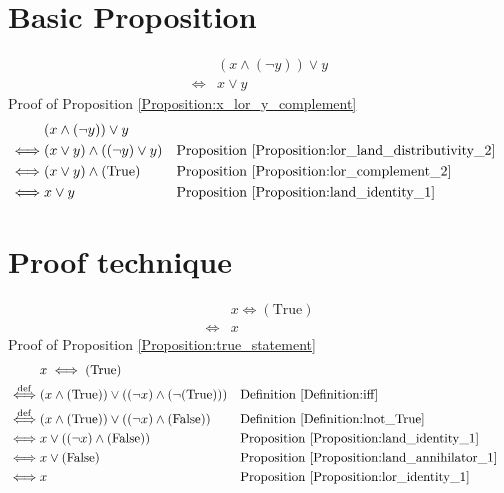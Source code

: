 \section{Basic Proposition}
\begin{prop}
\label{Proposition:x_lor_y_complement}
\begin{align*}
& (x \land (\lnot y)) \lor y \\
\iff & x \lor y
\end{align*}
Proof of Proposition \ref{Proposition:x_lor_y_complement}
\begin{align*}
& (x \land (\lnot y)) \lor y \\
\iff & (x \lor y) \land ((\lnot y) \lor y)
&& \text{Proposition \ref{Proposition:lor_land_distributivity_2}} \\
\iff & (x \lor y) \land (\text{True})
&& \text{Proposition \ref{Proposition:lor_complement_2}} \\
\iff & x \lor y
&& \text{Proposition \ref{Proposition:land_identity_1}} \\
\end{align*}
\end{prop}

\section{Proof technique}
\begin{prop}
\label{Proposition:true_statement}
\begin{align*}
& x \iff (\text{True}) \\
\iff & x
\end{align*}
Proof of Proposition \ref{Proposition:true_statement}
\begin{align*}
& x \iff (\text{True}) \\
\overset{\operatorname{def}}{\iff} & (x \land (\text{True})) \lor ((\lnot x) \land (\lnot (\text{True})))
&& \text{Definition \ref{Definition:iff}} \\
\overset{\operatorname{def}}{\iff} & (x \land (\text{True})) \lor ((\lnot x) \land (\text{False}))
&& \text{Definition \ref{Definition:lnot_True}} \\
\iff & x \lor ((\lnot x) \land (\text{False}))
&& \text{Proposition \ref{Proposition:land_identity_1}} \\
\iff & x \lor (\text{False})
&& \text{Proposition \ref{Proposition:land_annihilator_1}} \\
\iff & x
&& \text{Proposition \ref{Proposition:lor_identity_1}} \\
\end{align*}
\end{prop}

